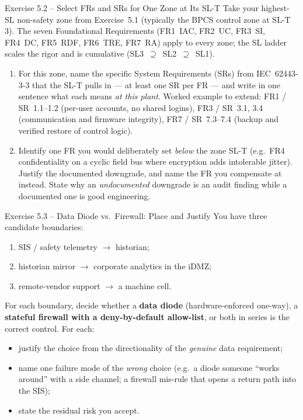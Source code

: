 \documentclass[11pt,a4paper]{article}
\begin{document}
\begin{taskbox}{Exercise 5.2 -- Select FRs and SRs for One Zone at Its SL-T}
Take your highest-SL non-safety zone from Exercise~5.1 (typically the BPCS control zone at SL-T\,3). The seven Foundational Requirements (FR1~IAC, FR2~UC, FR3~SI, FR4~DC, FR5~RDF, FR6~TRE, FR7~RA) apply to every zone; the SL ladder scales the rigor and is cumulative (SL3~$\supseteq$~SL2~$\supseteq$~SL1).
\begin{enumerate}
  \item For this zone, name the specific System Requirements (SRs) from IEC~62443-3-3 that the SL-T pulls in --- at least one SR per FR --- and write in one sentence what each means \emph{at this plant}. Worked example to extend: FR1 / SR~1.1--1.2 (per-user accounts, no shared logins), FR3 / SR~3.1, 3.4 (communication and firmware integrity), FR7 / SR~7.3--7.4 (backup and verified restore of control logic).
  \item Identify one FR you would deliberately set \emph{below} the zone SL-T (e.g.\ FR4 confidentiality on a cyclic field bus where encryption adds intolerable jitter). Justify the documented downgrade, and name the FR you compensate at instead. State why an \emph{undocumented} downgrade is an audit finding while a documented one is good engineering.
\end{enumerate}
\end{taskbox}

\begin{taskbox}{Exercise 5.3 -- Data Diode vs.\ Firewall: Place and Justify}
You have three candidate boundaries:
\begin{enumerate}
  \item SIS / safety telemetry $\to$ historian;
  \item historian mirror $\to$ corporate analytics in the iDMZ;
  \item remote-vendor support $\to$ a machine cell.
\end{enumerate}
For each boundary, decide whether a \textbf{data diode} (hardware-enforced one-way), a \textbf{stateful firewall with a deny-by-default allow-list}, or both in series is the correct control. For each:
\begin{itemize}\setlength{\itemsep}{1pt}
  \item justify the choice from the directionality of the \emph{genuine} data requirement;
  \item name one failure mode of the \emph{wrong} choice (e.g.\ a diode someone ``works around'' with a side channel; a firewall mis-rule that opens a return path into the SIS);
  \item state the residual risk you accept.
\end{itemize}
\end{taskbox}
\end{document}
